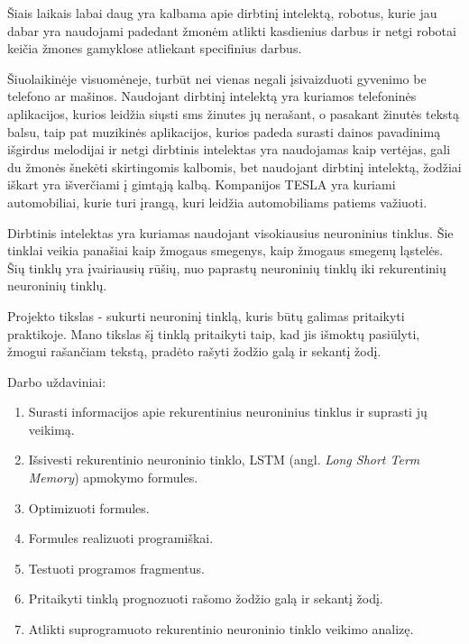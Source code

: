 Šiais laikais labai daug yra kalbama apie dirbtinį intelektą, robotus, kurie jau dabar yra naudojami padedant žmonėm atlikti kasdienius darbus ir netgi robotai keičia žmones gamyklose atliekant specifinius darbus.

Šiuolaikinėje visuomėneje, turbūt nei vienas negali įsivaizduoti gyvenimo be telefono ar mašinos. Naudojant dirbtinį intelektą yra kuriamos telefoninės aplikacijos, kurios leidžia siųsti sms žinutes jų nerašant, o pasakant žinutės tekstą balsu, taip pat muzikinės aplikacijos, kurios padeda surasti dainos pavadinimą išgirdus melodijai ir netgi dirbtinis intelektas yra naudojamas kaip vertėjas, gali du žmonės šnekėti skirtingomis kalbomis, bet naudojant dirbtinį intelektą, žodžiai iškart yra išverčiami į gimtąją kalbą. Kompanijos TESLA yra kuriami automobiliai, kurie turi įrangą, kuri leidžia automobiliams patiems važiuoti.

Dirbtinis intelektas yra kuriamas naudojant visokiausius neuroninius tinklus. Šie tinklai veikia panašiai kaip žmogaus smegenys, kaip žmogaus smegenų ląstelės. Šių tinklų yra įvairiausių rūšių, nuo paprastų neuroninių tinklų iki rekurentinių neuroninių tinklų.

Projekto tikslas - sukurti neuroninį tinklą, kuris būtų galimas pritaikyti praktikoje. Mano tikslas šį tinklą pritaikyti taip, kad jis išmoktų pasiūlyti, žmogui rašančiam tekstą, pradėto rašyti žodžio galą ir sekantį žodį.

Darbo uždaviniai:

\begin{enumerate}
  \item Surasti informacijos apie rekurentinius neuroninius tinklus ir suprasti jų veikimą.
  \item Išsivesti rekurentinio neuroninio tinklo, LSTM (angl. \textit{Long Short Term Memory}) apmokymo formules.
  \item Optimizuoti formules.
  \item Formules realizuoti programiškai.
  \item Testuoti programos fragmentus.
  \item Pritaikyti tinklą prognozuoti rašomo žodžio galą ir sekantį žodį.
  \item Atlikti suprogramuoto rekurentinio neuroninio tinklo veikimo analizę.
\end{enumerate}

\clearpage
